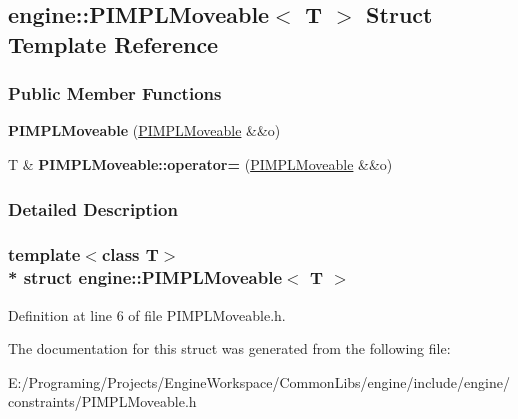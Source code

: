 \hypertarget{a00061}{}\subsection{engine\+:\+:P\+I\+M\+P\+L\+Moveable$<$ T $>$ Struct Template Reference}
\label{a00061}
\subsubsection*{Public Member Functions}
\begin{DoxyCompactItemize}
\item 
{\bfseries P\+I\+M\+P\+L\+Moveable} (\hyperlink{a00061}{P\+I\+M\+P\+L\+Moveable} \&\&o)\hypertarget{a00061_ad0b013508a9b2d94bc084819348bd8a0}{}\label{a00061_ad0b013508a9b2d94bc084819348bd8a0}

\item 
T \& {\bfseries P\+I\+M\+P\+L\+Moveable\+::operator=} (\hyperlink{a00061}{P\+I\+M\+P\+L\+Moveable} \&\&o)\hypertarget{a00061_ac67025e8a25edffe99fa9bf67ed8ca19}{}\label{a00061_ac67025e8a25edffe99fa9bf67ed8ca19}

\end{DoxyCompactItemize}


\subsubsection{Detailed Description}
\subsubsection*{template$<$class T$>$\\*
struct engine\+::\+P\+I\+M\+P\+L\+Moveable$<$ T $>$}



Definition at line 6 of file P\+I\+M\+P\+L\+Moveable.\+h.



The documentation for this struct was generated from the following file\+:\begin{DoxyCompactItemize}
\item 
E\+:/\+Programing/\+Projects/\+Engine\+Workspace/\+Common\+Libs/engine/include/engine/constraints/P\+I\+M\+P\+L\+Moveable.\+h\end{DoxyCompactItemize}
